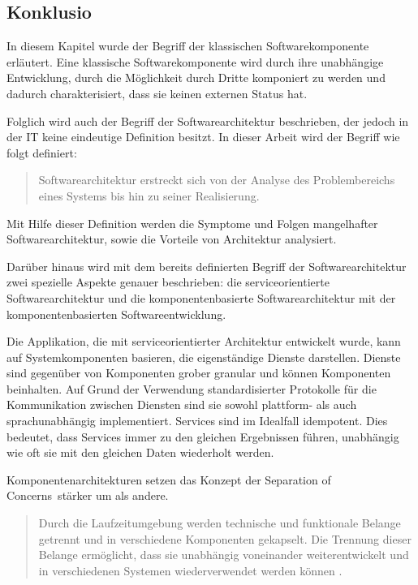 \subsection{Konklusio}
\label{sec:2_Konklusion}

In diesem Kapitel wurde der Begriff der klassischen Softwarekomponente erläutert. Eine klassische Softwarekomponente wird durch ihre unabhängige Entwicklung, durch die Möglichkeit durch Dritte komponiert zu werden und dadurch charakterisiert, dass sie keinen externen Status hat.

Folglich wird auch der Begriff der Softwarearchitektur beschrieben, der jedoch in der IT keine eindeutige Definition besitzt. In dieser Arbeit wird der Begriff wie folgt definiert:
\begin{quote}
Softwarearchitektur erstreckt sich von der Analyse des Problembereichs eines Systems bis hin zu seiner Realisierung.
\end{quote}

Mit Hilfe dieser Definition werden die Symptome und Folgen mangelhafter Softwarearchitektur, sowie die Vorteile von Architektur analysiert.

Darüber hinaus wird mit dem bereits definierten Begriff der Softwarearchitektur zwei spezielle Aspekte genauer beschrieben: die serviceorientierte Softwarearchitektur und die komponentenbasierte Softwarearchitektur mit der komponentenbasierten Softwareentwicklung.

Die Applikation, die mit serviceorientierter Architektur entwickelt wurde, kann auf Systemkomponenten basieren, die eigenständige Dienste darstellen. Dienste sind gegenüber von Komponenten grober granular und können Komponenten beinhalten. Auf Grund der Verwendung standardisierter Protokolle für die Kommunikation zwischen Diensten sind sie sowohl plattform- als auch sprachunabhängig implementiert. Services sind im Idealfall idempotent. Dies bedeutet, dass Services immer zu den gleichen Ergebnissen führen, unabhängig wie oft sie mit den gleichen Daten wiederholt werden.

Komponentenarchitekturen setzen das Konzept der \glqq Separation of Concerns\grqq\ stärker um als andere.
\begin{quote}
\glqq Durch die Laufzeitumgebung werden technische und funktionale Belange getrennt und in verschiedene Komponenten gekapselt. Die Trennung dieser Belange ermöglicht, dass sie unabhängig voneinander weiterentwickelt und in verschiedenen Systemen wiederverwendet werden können \citereset \autocite[siehe][S. 161-164]{Vogel.2009}. \grqq
\end{quote}

